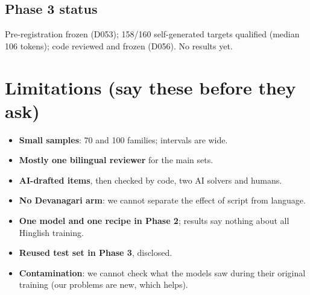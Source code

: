 \documentclass[11pt,a4paper]{article}
\begin{document}
\subsection{Phase 3 status}
Pre-registration frozen (D053); 158/160 self-generated targets qualified (median 106 tokens); code reviewed and frozen (D056). No results yet.

\section{Limitations (say these before they ask)}
\begin{itemize}
\item \textbf{Small samples}: 70 and 100 families; intervals are wide.
\item \textbf{Mostly one bilingual reviewer} for the main sets.
\item \textbf{AI-drafted items}, then checked by code, two AI solvers and humans.
\item \textbf{No Devanagari arm}: we cannot separate the effect of script from language.
\item \textbf{One model and one recipe in Phase 2}; results say nothing about all Hinglish training.
\item \textbf{Reused test set in Phase 3}, disclosed.
\item \textbf{Contamination}: we cannot check what the models saw during their original training (our problems are new, which helps).
\end{itemize}

\end{document}
